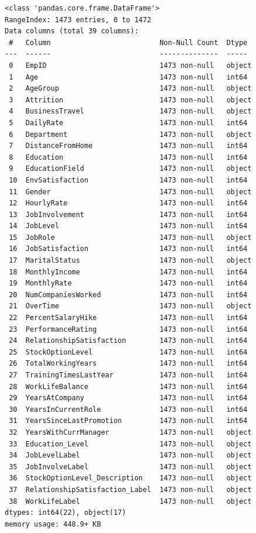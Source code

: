 \documentclass[
  letterpaper,
  DIV=11,
  numbers=noendperiod]{scrartcl}
\begin{document}
\begin{verbatim}
<class 'pandas.core.frame.DataFrame'>
RangeIndex: 1473 entries, 0 to 1472
Data columns (total 39 columns):
 #   Column                          Non-Null Count  Dtype 
---  ------                          --------------  ----- 
 0   EmpID                           1473 non-null   object
 1   Age                             1473 non-null   int64 
 2   AgeGroup                        1473 non-null   object
 3   Attrition                       1473 non-null   object
 4   BusinessTravel                  1473 non-null   object
 5   DailyRate                       1473 non-null   int64 
 6   Department                      1473 non-null   object
 7   DistanceFromHome                1473 non-null   int64 
 8   Education                       1473 non-null   int64 
 9   EducationField                  1473 non-null   object
 10  EnvSatisfaction                 1473 non-null   int64 
 11  Gender                          1473 non-null   object
 12  HourlyRate                      1473 non-null   int64 
 13  JobInvolvement                  1473 non-null   int64 
 14  JobLevel                        1473 non-null   int64 
 15  JobRole                         1473 non-null   object
 16  JobSatisfaction                 1473 non-null   int64 
 17  MaritalStatus                   1473 non-null   object
 18  MonthlyIncome                   1473 non-null   int64 
 19  MonthlyRate                     1473 non-null   int64 
 20  NumCompaniesWorked              1473 non-null   int64 
 21  OverTime                        1473 non-null   object
 22  PercentSalaryHike               1473 non-null   int64 
 23  PerformanceRating               1473 non-null   int64 
 24  RelationshipSatisfaction        1473 non-null   int64 
 25  StockOptionLevel                1473 non-null   int64 
 26  TotalWorkingYears               1473 non-null   int64 
 27  TrainingTimesLastYear           1473 non-null   int64 
 28  WorkLifeBalance                 1473 non-null   int64 
 29  YearsAtCompany                  1473 non-null   int64 
 30  YearsInCurrentRole              1473 non-null   int64 
 31  YearsSinceLastPromotion         1473 non-null   int64 
 32  YearsWithCurrManager            1473 non-null   object
 33  Education_Level                 1473 non-null   object
 34  JobLevelLabel                   1473 non-null   object
 35  JobInvolveLabel                 1473 non-null   object
 36  StockOptionLevel_Description    1473 non-null   object
 37  RelationshipSatisfaction_Label  1473 non-null   object
 38  WorkLifeLabel                   1473 non-null   object
dtypes: int64(22), object(17)
memory usage: 448.9+ KB
\end{verbatim}
\end{document}
